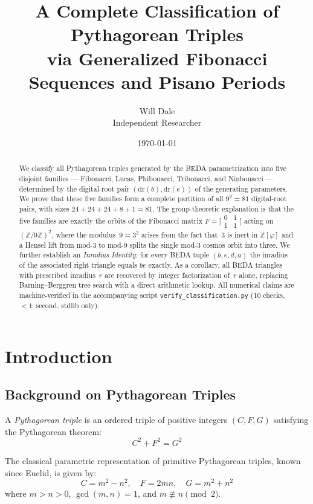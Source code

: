 \documentclass[12pt]{article}
\title{A Complete Classification of Pythagorean Triples\\via Generalized Fibonacci Sequences and Pisano Periods}
\author{Will Dale\\[4pt]
\small Independent Researcher}
\date{\today}
\begin{document}
\maketitle

\begin{abstract}
We classify all Pythagorean triples generated by the BEDA parametrization into five
disjoint families --- Fibonacci, Lucas, Phibonacci, Tribonacci, and Ninbonacci ---
determined by the digital-root pair $(\mathrm{dr}(b),\mathrm{dr}(e))$ of the
generating parameters.  We prove that these five families form a complete partition of
all $9^2=81$ digital-root pairs, with sizes $24+24+24+8+1=81$.  The group-theoretic
explanation is that the five families are exactly the orbits of the Fibonacci matrix
$F=\bigl[\begin{smallmatrix}0&1\\1&1\end{smallmatrix}\bigr]$ acting on
$(\mathbb{Z}/9\mathbb{Z})^2$, where the modulus~$9=3^2$ arises from the fact that~$3$
is inert in $\mathbb{Z}[\varphi]$ and a Hensel lift from mod-$3$ to mod-$9$ splits the
single mod-$3$ cosmos orbit into three.  We further establish an
\emph{Inradius Identity}: for every BEDA tuple $(b,e,d,a)$ the inradius of the
associated right triangle equals $be$ exactly.  As a corollary, all BEDA triangles
with prescribed inradius~$r$ are recovered by integer factorization of~$r$ alone,
replacing Barning--Berggren tree search with a direct arithmetic lookup.
All numerical claims are machine-verified in the accompanying script
\texttt{verify\_classification.py} (10 checks, ${<}1$~second, stdlib only).
\end{abstract}

\section{Introduction}

\subsection{Background on Pythagorean Triples}

A \emph{Pythagorean triple} is an ordered triple of positive integers $(C, F, G)$
satisfying the Pythagorean theorem:
\begin{equation}
C^2 + F^2 = G^2
\end{equation}

The classical parametric representation of primitive Pythagorean triples, known since Euclid, is given by:
\begin{equation}
C = m^2 - n^2, \quad F = 2mn, \quad G = m^2 + n^2
\end{equation}
where $m > n > 0$, $\gcd(m,n) = 1$, and $m \not\equiv n \pmod{2}$.
\end{document}
